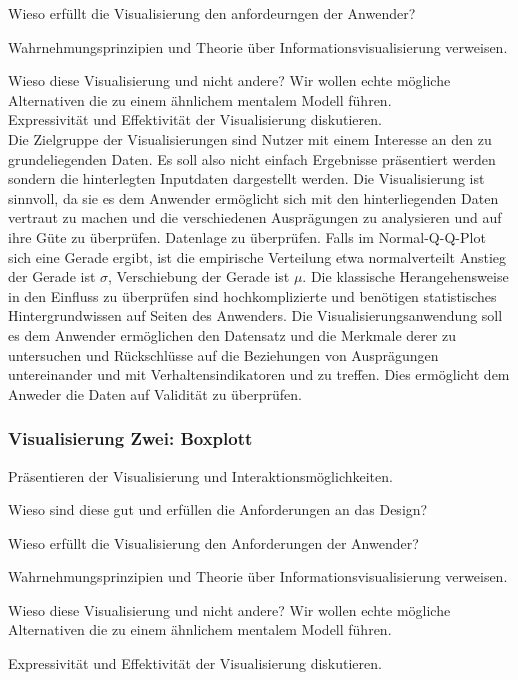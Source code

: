 \documentclass[usegeometry=true]{scrartcl}
\begin{document}
Wieso erfüllt die Visualisierung den anfordeurngen der Anwender?

Wahrnehmungsprinzipien und Theorie über Informationsvisualisierung verweisen.

Wieso diese Visualisierung und nicht andere? 
Wir wollen echte mögliche Alternativen die zu einem ähnlichem mentalem Modell führen.\\

Expressivität und Effektivität der Visualisierung diskutieren.\\
Die Zielgruppe der Visualisierungen sind Nutzer mit einem Interesse an den zu grundeliegenden Daten. 
 Es soll also nicht einfach Ergebnisse präsentiert werden sondern die hinterlegten Inputdaten dargestellt werden.
Die Visualisierung ist sinnvoll, da sie es dem Anwender ermöglicht sich mit den hinterliegenden
Daten vertraut zu machen und die verschiedenen Ausprägungen zu analysieren und auf ihre Güte zu überprüfen.
 Datenlage zu überprüfen.
Falls im Normal-Q-Q-Plot sich eine Gerade ergibt, ist die
empirische Verteilung etwa normalverteilt
Anstieg der Gerade ist $\sigma$, Verschiebung der Gerade ist $\mu$.
Die klassische Herangehensweise in den Einfluss zu überprüfen sind hochkomplizierte und benötigen
 statistisches Hintergrundwissen auf Seiten des Anwenders. Die Visualisierungsanwendung soll es dem Anwender ermöglichen 
 den Datensatz und die Merkmale derer zu untersuchen und Rückschlüsse auf die Beziehungen von Ausprägungen untereinander und mit Verhaltensindikatoren und zu treffen. Dies ermöglicht dem Anweder die Daten auf Validität zu überprüfen.\\


\subsubsection{Visualisierung Zwei: Boxplott}
Präsentieren der Visualisierung und Interaktionsmöglichkeiten. 

Wieso sind diese gut und erfüllen die Anforderungen an das Design?

Wieso erfüllt die Visualisierung den Anforderungen der Anwender?

Wahrnehmungsprinzipien und Theorie über Informationsvisualisierung verweisen.

Wieso diese Visualisierung und nicht andere? Wir wollen echte mögliche 
Alternativen die zu einem ähnlichem mentalem Modell führen.

Expressivität und Effektivität der Visualisierung diskutieren.\\
\end{document}
